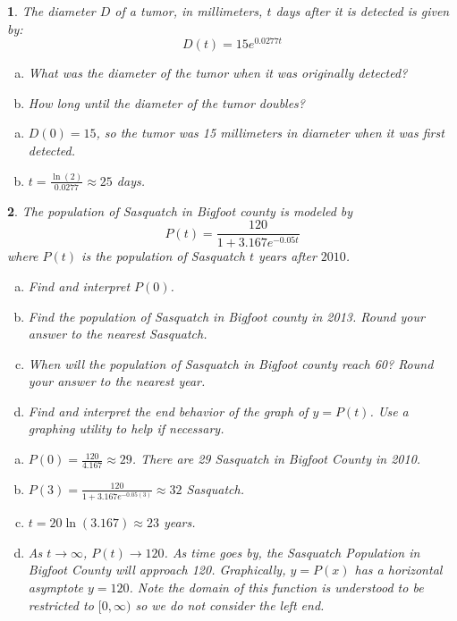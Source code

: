 \documentclass{amsbook}
\newcommand{\ssp}{\begin{enumerate}[(a), leftmargin=*]}
\newcommand{\esp}{\end{enumerate}}
\newtheorem{exc}{}
\newenvironment{ex}{\begin{exc}\normalfont}{\end{exc}}
\numberwithin{section}{chapter}
\numberwithin{equation}{chapter}
\begin{document}
\begin{ex}
 The diameter $D$ of a tumor, in millimeters, $t$ days after it is detected is given by:  \[D(t) = 15e^{0.0277t} \]
 \ssp
 	\item  What was the diameter of the tumor when it was originally detected?
 \item  How long until the diameter of the tumor doubles?
 \esp
	\begin{sol}
 \ssp
\item $D(0) = 15$, so the tumor was 15 millimeters in diameter when it was first detected.
\item  $t = \frac{\ln(2)}{0.0277} \approx 25$ days.  
\esp
	\end{sol}
\end{ex}

\begin{ex}
 The population of Sasquatch in Bigfoot county is modeled by \[P(t) = \dfrac{120}{1 + 3.167e^{-0.05t}}\] where $P(t)$ is the population of Sasquatch $t$ years after $2010$.
 \ssp
\item  Find and interpret $P(0)$.

\item  Find the population of Sasquatch in Bigfoot county in 2013.  Round your answer to the nearest Sasquatch.

\item  When will the population of Sasquatch in Bigfoot county reach 60?  Round your answer to the nearest year.

\item  Find and interpret the end behavior of the graph of $y = P(t)$. Use a graphing utility to help if necessary.
 \esp
 
\begin{sol}
	\ssp
	  \item  $P(0) = \frac{120}{4.167} \approx 29$.  There are 29 Sasquatch in Bigfoot County in 2010.
		
		\item  $P(3) = \frac{120}{1+3.167e^{-0.05(3)}} \approx 32$ Sasquatch.
		
		\item  $t = 20 \ln(3.167) \approx 23$ years.
		
		\item  As $t \rightarrow \infty$, $P(t) \rightarrow 120$.  As time goes by, the Sasquatch Population in Bigfoot County will approach 120.  Graphically,  $y = P(x)$ has a horizontal asymptote $y=120$. Note the domain of this function is understood to be restricted to $[0, \infty)$ so we do not consider the left end.
	\esp
	\end{sol}
\end{ex}
\end{document}
